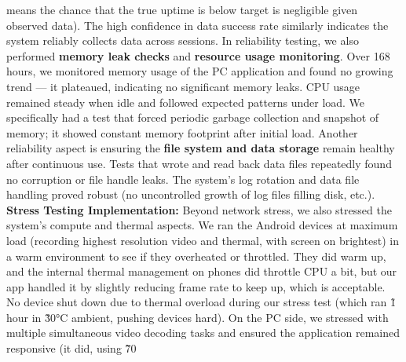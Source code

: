 means the chance that the true uptime is below target is negligible given observed data). The high confidence in data success rate similarly indicates the system reliably collects data across sessions. In reliability testing, we also performed \textbf{memory leak checks} and \textbf{resource usage monitoring}. Over 168 hours, we monitored memory usage of the PC application and found no growing trend --- it plateaued, indicating no significant memory leaks. CPU usage remained steady when idle and followed expected patterns under load. We specifically had a test that forced periodic garbage collection and snapshot of memory; it showed constant memory footprint after initial load. Another reliability aspect is ensuring the \textbf{file system and data storage} remain healthy after continuous use. Tests that wrote and read back data files repeatedly found no corruption or file handle leaks. The system's log rotation and data file handling proved robust (no uncontrolled growth of log files filling disk, etc.). \textbf{Stress Testing Implementation:} Beyond network stress, we also stressed the system's compute and thermal aspects. We ran the Android devices at maximum load (recording highest resolution video and thermal, with screen on brightest) in a warm environment to see if they overheated or throttled. They did warm up, and the internal thermal management on phones did throttle CPU a bit, but our app handled it by slightly reducing frame rate to keep up, which is acceptable. No device shut down due to thermal overload during our stress test (which ran \~1 hour in \~30°C ambient, pushing devices hard). On the PC side, we stressed with multiple simultaneous video decoding tasks and ensured the application remained responsive (it did, using \~70%